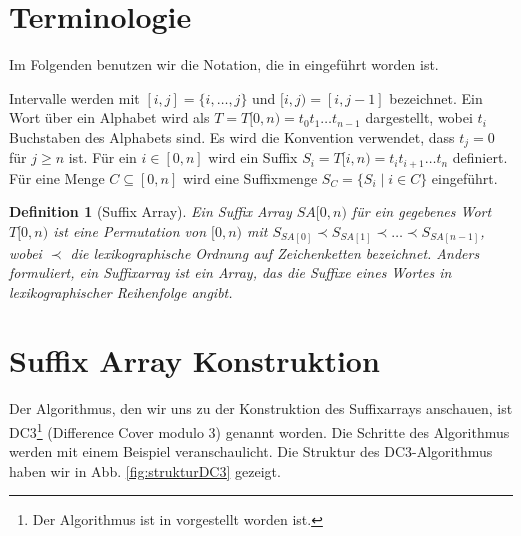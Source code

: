 \documentclass[12pt]{report}
\newtheorem{definition}{Definition}
\begin{document}
\section{Terminologie}
\label{sec:Terminologie}
Im Folgenden benutzen wir die Notation, die in \cite{Karkkainen2006} eingeführt worden ist.

Intervalle werden mit $[i,j] = \{ i, \dots, j\}$ und $[i,j) = [i,j-1]$ bezeichnet. Ein Wort über ein Alphabet wird als $T = T[0,n) = t_0 t_1 \dots t_{n-1}$ dargestellt, wobei $t_i$ Buchstaben des Alphabets sind. Es wird die Konvention verwendet, dass $t_j = 0$ für $j \ge n$ ist. Für ein $i \in [0,n]$ wird ein Suffix $S_i = T[i,n) = t_i t_{i+1} \dots t_n$ definiert. Für eine Menge $C \subseteq [0,n]$ wird eine Suffixmenge $S_C = \{ S_i \mid i \in C\}$ eingeführt.

\begin{definition}[Suffix Array]
Ein Suffix Array $SA[0,n)$ für ein gegebenes Wort $T[0,n)$ ist eine Permutation von $[0,n)$ mit $S_{SA[0]} \prec S_{SA[1]} \prec \dots \prec S_{SA[n-1]}$, wobei $\prec$ die lexikographische Ordnung auf Zeichenketten bezeichnet. Anders formuliert, ein Suffixarray ist ein Array, das die Suffixe eines Wortes in lexikographischer Reihenfolge angibt.
\end{definition}

\section{Suffix Array Konstruktion}
\label{sec:SuffixArrayKonstruktion}

Der Algorithmus, den wir uns zu der Konstruktion des Suffixarrays anschauen, ist DC3\footnote{Der Algorithmus ist in \cite{Karkkainen2006} vorgestellt worden ist.} (Difference Cover modulo 3) genannt worden. Die Schritte des Algorithmus werden mit einem Beispiel veranschaulicht. Die Struktur des DC3-Algorithmus haben wir in Abb. \ref{fig:strukturDC3} gezeigt.
\end{document}

